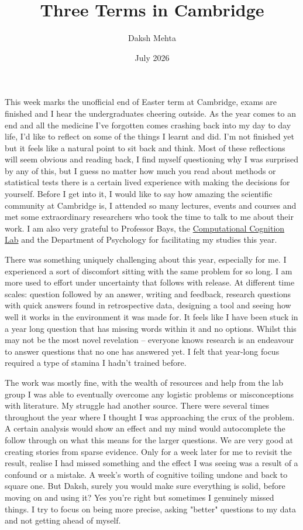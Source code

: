 \documentclass{article}
\title{Three Terms in Cambridge}
\date{July 2026}
\author{Daksh Mehta}
\begin{document}
This week marks the unofficial end of Easter term at Cambridge, exams are finished and I hear the undergraduates cheering outside. As the year comes to an end and all the medicine I've forgotten comes crashing back into my day to day life, I'd like to reflect on some of the things I learnt and did. I'm not finished yet but it feels like a natural point to sit back and think. Most of these reflections will seem obvious and reading back, I find myself questioning why I was surprised by any of this, but I guess no matter how much you read about methods or statistical tests there is a certain lived experience with making the decisions for yourself. Before I get into it, I would like to say how amazing the scientific community at Cambridge is, I attended so many lectures, events and courses and met some extraordinary researchers who took the time to talk to me about their work. I am also very grateful to Professor Bays, the \href{https://bayslab.com}{Computational Cognition Lab} and the Department of Psychology for facilitating my studies this year. 

There was something uniquely challenging about this year, especially for me. I experienced a sort of discomfort sitting with the same problem for so long. I am more used to effort under uncertainty that follows with release. At different time scales: question followed by an answer, writing and feedback, research questions with quick answers found in retrospective data, designing a tool and seeing how well it works in the environment it was made for. It feels like I have been stuck in a year long question that has missing words within it and no options. Whilst this may not be the most novel revelation – everyone knows research is an endeavour to answer questions that no one has answered yet. I felt that year-long focus required a type of stamina I hadn't trained before. 

The work was mostly fine, with the wealth of resources and help from the lab group I was able to eventually overcome any logistic problems or misconceptions with literature. My struggle had another source. There were several times throughout the year where I thought I was approaching the crux of the problem. A certain analysis would show an effect and my mind would autocomplete the follow through on what this means for the larger questions. We are very good at creating stories from sparse evidence. Only for a week later for me to revisit the result, realise I had missed something and the effect I was seeing was a result of a confound or a mistake. A week's worth of cognitive toiling undone and back to square one. But Daksh, surely you would make sure everything is solid, before moving on and using it? Yes you're right but sometimes I genuinely missed things. I try to focus on being more precise, asking "better" questions to my data and not getting ahead of myself. 
\end{document}
